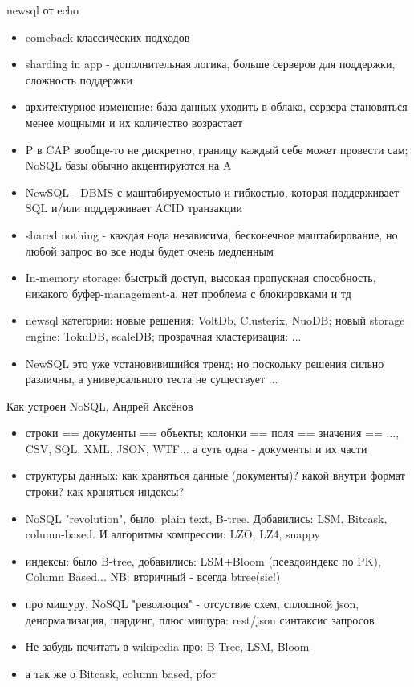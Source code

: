 \documentclass[aspectratio=169]{beamer}
\begin{document}
\begin{frame}{newsql от echo}
\begin{itemize}
  \item comeback классических подходов
  \item sharding in app - дополнительная логика, больше серверов для поддержки, сложность поддержки
  \item архитектурное изменение: база данных уходить в облако, сервера становяться менее мощными и их количество возрастает
  \item P в CAP вообще-то не дискретно, границу каждый себе может провести сам; NoSQL базы обычно акцентируются на A
  \item NewSQL - DBMS с маштабируемостью и гибкостью, которая поддерживает SQL и/или поддерживает ACID транзакции
  \item shared nothing - каждая нода независима, бесконечное маштабирование, но любой запрос во все ноды будет очень медленным
  \item In-memory storage: быстрый доступ, высокая пропускная способность, никакого буфер-management-а, нет проблема с блокировками и тд
  \item newsql категории: новые решения: VoltDb, Clusterix, NuoDB; новый storage engine: TokuDB, scaleDB; прозрачная кластеризация: ...
  \item NewSQL это уже установивишийся тренд; но поскольку решения сильно различны, а универсального теста не существует ...
\end{itemize}
\end{frame}
  
\begin{frame}{Как устроен NoSQL, Андрей Аксёнов}
\begin{itemize}
  \item строки == документы == объекты; колонки == поля == значения == ..., CSV, SQL, XML, JSON, WTF... а суть одна - документы и их части
  \item структуры данных: как храняться данные (документы)? какой внутри формат строки? как храняться индексы?
  \item NoSQL "revolution", было: plain text, B-tree. Добавились: LSM, Bitcask, column-based. И алгоритмы компрессии: LZO, LZ4, snappy
  \item индексы: было B-tree, добавились: LSM+Bloom (псевдоиндекс по PK), Column Based... NB: вторичный - всегда btree(sic!)
  \item про мишуру, NoSQL "революция" - отсуствие схем, сплошной json, денормализация, шардинг, плюс мишура: rest/json синтаксис запросов
  \item Не забудь почитать в wikipedia про: B-Tree, LSM, Bloom
  \item а так же о Bitcask, column based, pfor
\end{itemize}
\end{frame}
\end{document}

